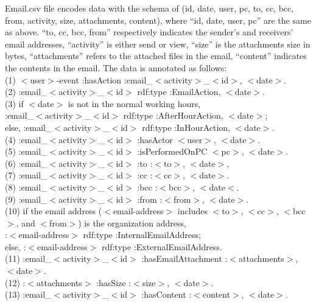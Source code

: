 Email.csv file encodes data with the schema of (id, date, user, pc, to, cc, bcc, from, activity, size, attachments, content), where ``id, date, user, pc'' are the same as above. 
``to, cc, bcc, from'' respectively indicates the sender's and receivers' email addresses, ``activity'' is either send or view, ``size'' is the attachments size in bytes, ``attachments'' refers to the attached files in the email, ``content'' indicates the contents in the email. 
The data is annotated as follows: \\
(1) $<$user$>$-event :hasAction :email\_$<$activity$>$\_$<$id$>$, $<$date$>$. \\
(2) :email\_$<$activity$>$\_$<$id$>$ rdf:type :EmailAction, $<$date$>$. \\
(3) if $<$date$>$ is not in the normal working hours, \\
:email\_$<$activity$>$\_$<$id$>$ rdf:type :AfterHourAction, $<$date$>$; \\
else, :email\_$<$activity$>$\_$<$id$>$ rdf:type :InHourAction, $<$date$>$. \\ 
(4) :email\_$<$activity$>$\_$<$id$>$ :hasActor $<$user$>$, $<$date$>$. \\
(5) :email\_$<$activity$>$\_$<$id$>$ :isPerformedOnPC $<$pc$>$, $<$date$>$.\\ 
(6) :email\_$<$activity$>$\_$<$id$>$ :to :$<$to$>$, $<$date$>$,\\
(7) :email\_$<$activity$>$\_$<$id$>$ :cc :$<$cc$>$, $<$date$>$. \\
(8) :email\_$<$activity$>$\_$<$id$>$ :bcc :$<$bcc$>$, $<$date$<$. \\
(9) :email\_$<$activity$>$\_$<$id$>$ :from :$<$from$>$, $<$date$>$. \\
(10) if the email address ($<$email-address$>$ includes $<$to$>$, $<$cc$>$, $<$bcc$>$, and $<$from$>$) is the organization address,\\
:$<$email-address$>$ rdf:type :InternalEmailAddress;\\
else, :$<$email-address$>$ rdf:type :ExternalEmailAddress.\\ 
(11) :email\_$<$activity$>$\_$<$id$>$ :hasEmailAttachment :$<$attachments$>$, $<$date$>$. \\
(12) :$<$attachments$>$ :hasSize :$<$size$>$, $<$date$>$.\\
(13) :email\_$<$activity$>$\_$<$id$>$ :hasContent :$<$content$>$, $<$date$>$. 

